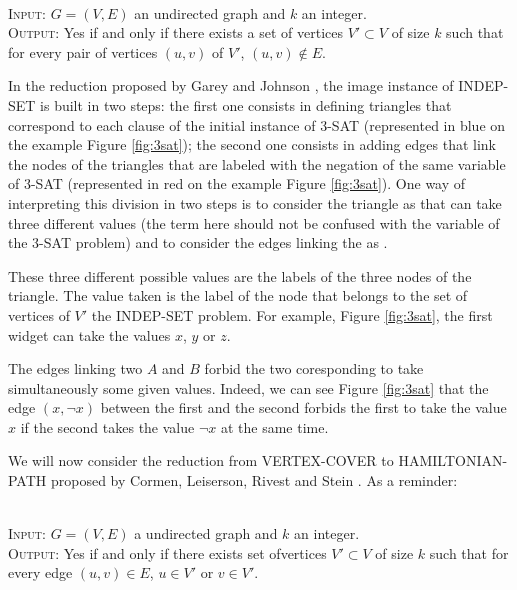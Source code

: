 \begin{definition} 
\ \\
\textsc{Input:} $G=(V,E)$ an undirected graph and $k$ an integer.\\
\textsc{Output:} Yes if and only if there exists a set of vertices
$V' \subset V$ of size $k$ such that for every pair of vertices
$(u,v)$ of $V'$, $(u,v) \notin E$.\\
\end{definition}

  

In the reduction proposed by Garey and Johnson \cite{garey}, the image
instance of INDEP-SET is built in two steps: the first one consists in
defining triangles that correspond to each clause of the initial
instance of 3-SAT (represented in blue on the example Figure
\ref{fig:3sat}); the second one consists in adding edges that link the
nodes of the triangles that are labeled with the negation of the same
variable of 3-SAT (represented in red on the example Figure
\ref{fig:3sat}). One way of interpreting this division in two steps is
to consider the triangle \widgets as \variables that can take three
different values (the \variable term here should not be confused with
the variable of the 3-SAT problem) and to consider the edges linking
the \widgets as \constraints.

These three different possible values are the labels of the three
nodes of the triangle. The value taken is the label of the node that
belongs to the set of vertices of $V'$ the INDEP-SET problem. For
example, Figure \ref{fig:3sat}, the first widget can take the
values $x$, $y$ or $z$.

The edges linking two \widgets $A$ and $B$ forbid the two coresponding
\variables to take simultaneously some given values. Indeed, we can
see Figure \ref{fig:3sat} that the edge $(x, \neg x)$ between the
first and the second \widgets forbids the first \widget to take the
value $x$ if the second takes the value $\neg x$ at the same time.

We will now consider the reduction from VERTEX-COVER to
HAMILTONIAN-PATH proposed by Cormen, Leiserson, Rivest and Stein
\cite{cormen}. As a reminder:

\begin{definition}
\ \\
  \textsc{Input:} $G=(V,E)$ a undirected graph and $k$ an integer. \\
  \textsc{Output:} Yes if and only if there exists set ofvertices $V'
  \subset V$ of size $k$ such that for every edge $(u,v) \in E$, $u
  \in V'$ or $v \in V'$.\\
\end{definition}

